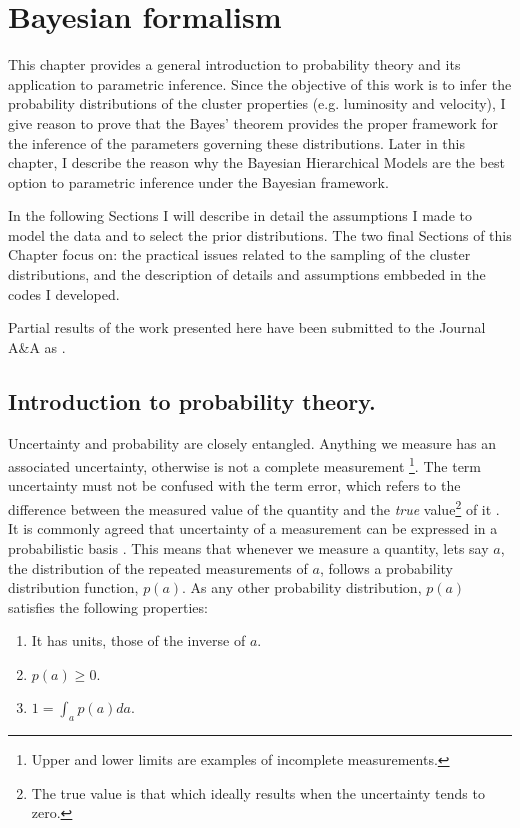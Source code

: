 \chapter{Bayesian formalism}
\label{chap:BHM}
This chapter provides a general introduction to probability theory and its application to parametric inference. Since the objective of this work is to infer the probability distributions of the cluster properties (e.g. luminosity and velocity), I give reason to prove that the Bayes' theorem provides the proper framework for the inference of the parameters governing these distributions. Later in this chapter, I describe the reason why the Bayesian Hierarchical Models are the best option to parametric inference under the Bayesian framework.

In the following Sections I will describe in detail the assumptions I made to model the data and to select the prior distributions. The two final Sections of this Chapter focus on: the practical issues related to the sampling of the cluster distributions, and the description of details and assumptions embbeded in the codes I developed.

Partial results of the work presented here have been submitted to the Journal A\&A as \citet{Olivares2017}.

\section{Introduction to probability theory.}
 
Uncertainty and probability are closely entangled. Anything we measure has an associated uncertainty, otherwise is not a complete measurement \footnote{Upper and lower limits are examples of incomplete measurements.}. The term uncertainty must not be confused with the term error, which refers to the difference between the measured value of the quantity and the \emph{true} value\footnote{The true value is that which ideally results when the uncertainty tends to zero.} of it \citep{GUM2008}. It is commonly agreed that uncertainty of a measurement can be expressed in a probabilistic basis \citep{GUM2008}. This means that whenever we measure a quantity, lets say $a$, the distribution of the repeated measurements of $a$, follows a probability distribution function, $p(a)$. As any other probability distribution, $p(a)$ satisfies the following properties:

\begin{enumerate}[label=\textbf{Property \arabic*}]
\item  It has units, those of the inverse of $a$. \label{property:1}
\item $p(a) \geq 0$. \label{property:3}
\item $1=\int_a p(a) da$. \label{property:3}
\end{enumerate}

